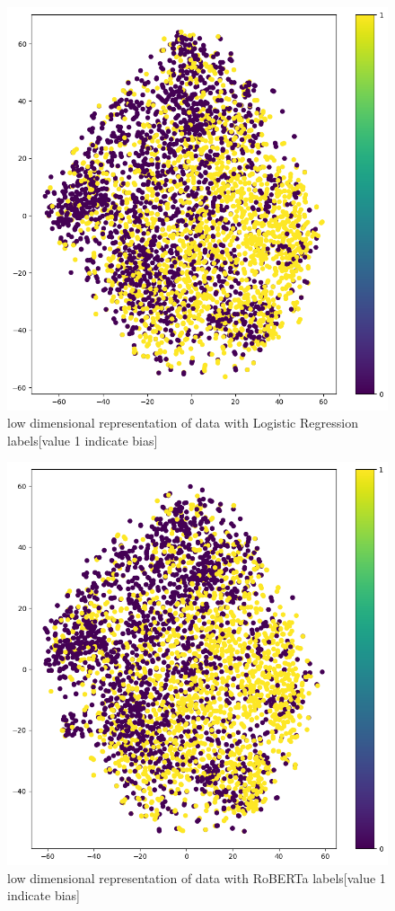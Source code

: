 \documentclass[11pt,a4paper]{article}
\begin{document}
\begin{figure}[H]
    \centering
    \includegraphics[width=0.9\linewidth]{Labels_Logistic_tsne_plot.png}
    \caption{low dimensional representation of data with Logistic Regression labels[value 1 indicate bias]}
    \label{fig:t-sne_logic}
\end{figure}
\begin{figure}[H]
    \centering
    \includegraphics[width=0.9\linewidth]{Labels_RoBERTa_tsne_plot.png}
    \caption{low dimensional representation of data with RoBERTa labels[value 1 indicate bias]}
    \label{fig:t-sne_RoBERTa}
\end{figure}
\end{document}
